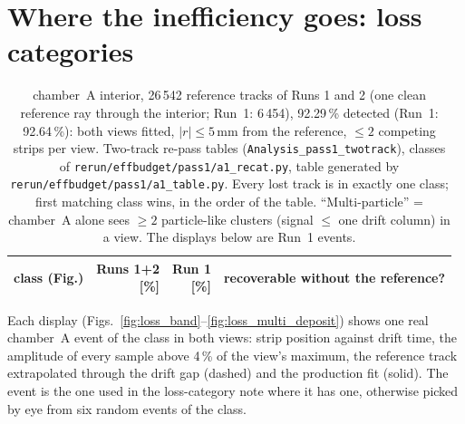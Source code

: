 \section{Where the inefficiency goes: loss categories}\label{app:losses}

\begin{table}[tbp]
  \centering\small
  \caption{chamber~A interior, 26\,542 reference tracks of Runs 1 and 2 (one clean reference ray through the interior; Run~1: 6\,454),
  92.29\,\% detected (Run~1: 92.64\,\%): both views fitted, $|r|\le5$\,mm from the reference, $\le2$ competing strips per
  view. Two-track re-pass tables (\texttt{Analysis\_pass1\_twotrack}), classes of \texttt{rerun/effbudget/pass1/a1\_recat.py},
  table generated by \texttt{rerun/effbudget/pass1/a1\_table.py}. Every lost track is in exactly
  one class; first matching class wins, in the order of the table. ``Multi-particle'' = chamber~A alone sees $\ge2$
  particle-like clusters (signal $\le$ one drift column) in a view. The displays below are Run~1 events.}
  \label{tab:losses}
  \begin{tabular}{p{5.3cm}rrp{6.6cm}}
    \hline
    class (Fig.) & \shortstack{Runs 1+2\\{}[\%]} & \shortstack{Run 1\\{}[\%]} & recoverable without the reference? \\
    \hline
  \end{tabular}
\end{table}


Each display (Figs.~\ref{fig:loss_band}--\ref{fig:loss_multi_deposit}) shows one real chamber~A event of the class in both
views: strip position against drift time, the amplitude of every sample above 4\,\% of the view's maximum, the reference
track extrapolated through the drift gap (dashed) and the production fit (solid). The event is the one used in the
loss-category note where it has one, otherwise picked by eye from six random events of the class.

